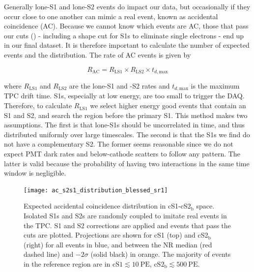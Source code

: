 Generally lone-S1 and lone-S2 events do impact our data, but occasionally if they occur close to one another can mimic a real event, known
as accidental coincidence (AC).  Because we cannot know which events are AC, those that pass our cuts 
() - including a shape cut for S1s to eliminate single electrons - end up
in our final dataset.  It is therefore important to calculate the
number of expected events and the distribution.  The rate of AC events is given by

\begin{equation}
R_{\mathrm{AC}} = R_{\mathrm{LS1}} \times R_{\mathrm{LS2}} \times t_{d, \mathrm{max}}
\label{eq:er_nr_calibrations_parameter_determ_additional_components_accidental_coincidence}
\end{equation}

\noindent where $R_{\mathrm{LS1}}$ and $R_{\mathrm{LS2}}$ are the lone-S1
and -S2 rates and $t_{d, \mathrm{max}}$ is the maximum TPC drift time.  S1s, especially at low energy, are too small to trigger the
DAQ.  Therefore, to calculate $R_{\mathrm{LS1}}$ we select higher energy good events that contain an S1 and S2, and search the region
before the primary S1.  This method makes two assumptions.  The first is that lone-S1s should be uncorrelated in time, and thus
distributed uniformly over large timescales.  The second is that the S1s we find do not have a complementary S2.  The former
seems reasonable since we do not expect PMT dark rates and below-cathode scatters to follow any pattern.  The latter is valid because
the probability of having two interactions in the same time window is negligible.

\begin{figure}
\centering
\texttt{[image: ac\_s2s1\_distribution\_blessed\_sr1]}
\caption{Expected accidental coincidence distribution in cS1-cS2$_{\mathrm{b}}$ space.  Isolated S1s and S2s are randomly coupled to
imitate real events in the TPC.  S1 and S2 corrections are applied and events that pass the cuts are plotted.  Projections are
shown for cS1 (top) and cS2$_{\mathrm{b}}$ (right) for all events in blue, and between the NR median (red dashed line) and
$-2 \sigma$ (solid black) in orange.  The majority of events in the reference region are in $\mathrm{cS1} \lesssim 10\ \mathrm{PE}$,
$\mathrm{cS2_b} \lesssim 500\ \mathrm{PE}$.}
\label{fig:er_nr_calibrations_parameter_determ_ac}
\end{figure}

